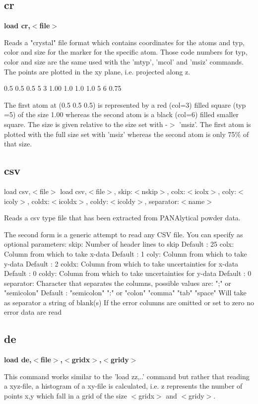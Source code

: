 \subsection*{cr}
{\bf load cr,$ <$file$> $ \par }
\par
\vspace{3pt}
Reads a "crystal" file format which contains coordinates for 
the atoms and typ, color and size for the marker for the specific 
atom. Those code numbers for typ, color and size are the same used 
with the 'mtyp', 'mcol' and 'msiz' commands. The points are plotted 
in the xy plane, i.e. projected along z. 
\par
\begin{MacVerbatim}
  0.5 0.5 0.5   5 3 1.00
  1.0 1.0 1.0   5 6 0.75
\end{MacVerbatim}
The first atom at (0.5 0.5 0.5) is represented by a red (col=3) 
filled square (typ =5) of the size 1.00 whereas the second atom 
is a black (col=6) filled smaller square. The size is given relative 
to the size set with -$> $ 'msiz'. The first atom is plotted with the 
full size set with 'msiz' whereas the second atom is only 75\% of 
that size. 
\subsection*{csv}
load csv,$ <$file$> $ 
load csv,$ <$file$> $, skip:$ <$nskip$> $, 
        colx:$ <$icolx$> $, coly:$ <$icoly$> $, coldx:$ <$icoldx$> $, coldy:$ <$icoldy$> $, 
        separator:$ <$name$> $ 
\par
Reads a csv type file that has been extracted from PANAlytical 
powder data. 
\par
The second form is a generic attempt to read any CSV file. 
You can specify as optional parameters: 
skip:  Number of header lines to skip     Default : 25 
colx:  Column from which to take x-data   Default :  1 
coly:  Column from which to take y-data   Default :  2 
coldx: Column from which to take uncertainties for x-data Default : 0 
coldy: Column from which to take uncertainties for y-data Default : 0 
separator: Character that separates the columns, possible values are: 
           ";" or "semicolon"             Default  : "semicolon" 
           ":" or "colon" 
           "comma" 
           "tab" 
           "space" Will take as separator a string of blank(s) 
If the error columns are omitted or set to zero no error data are read 
\subsection*{de}
{\bf load de,$ <$file$> $,$ <$gridx$> $,$ <$gridy$> $ \par }
\par
\vspace{3pt}
This command works similar to the 'load zz,..' command but rather 
that reading a xyz-file, a histogram of a xy-file is calculated, 
i.e. z represents the number of points x,y which fall in a grid 
of the size $ <$gridx$> $ and $ <$gridy$> $. 
